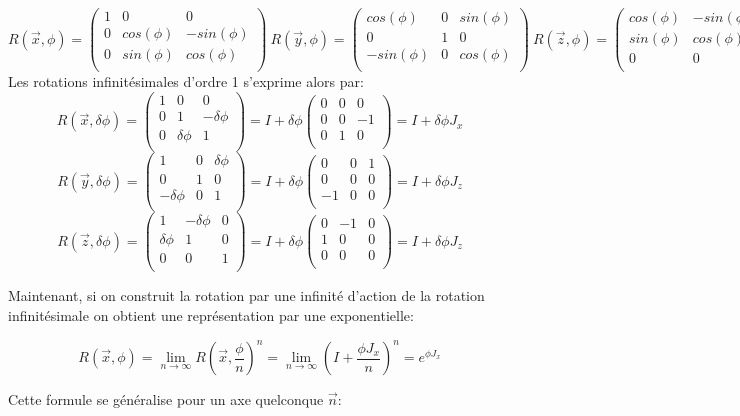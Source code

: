 \documentclass[12pt,a4paper]{article}
\newcommand{\Jx}
{
\begin{pmatrix}
	0&0&0\\
	0&0&-1\\
	0&1&0\\
\end{pmatrix}
}
\newcommand{\Jy}
{
	\begin{pmatrix}
		0&0&1\\
		0&0&0\\
		-1&0&0\\
	\end{pmatrix}
}
\newcommand{\Jz}
{
	\begin{pmatrix}
		0&-1&0\\
		1&0&0\\
		0&0&0\\
	\end{pmatrix}
}
\begin{document}
	\[	
	R(\vec{x},\phi)=
	\begin{pmatrix}
	1&0&0\\
	0&cos(\phi)&-sin(\phi)\\
	0&sin(\phi)&cos(\phi)\\	
	\end{pmatrix}\ 
	R(\vec{y},\phi)=
	\begin{pmatrix}
	cos(\phi)&0&sin(\phi)\\
	0&1&0\\
	-sin(\phi)&0&cos(\phi)\\
	\end{pmatrix}
	\  
	R(\vec{z},\phi)=
	\begin{pmatrix}
	cos(\phi)&-sin(\phi)&0\\
	sin(\phi)&cos(\phi)&0\\
	0&0&1\\
	\end{pmatrix}
	\]
	Les rotations infinitésimales d'ordre 1 s'exprime alors par:
	\[	
	R(\vec{x},\delta\phi)=
	\begin{pmatrix}
	1&0&0\\
	0&1&-\delta\phi\\
	0&\delta\phi&1\\	
	\end{pmatrix}= I + \delta\phi \Jx= I + \delta\phi J_x
	\]
	\[	
	R(\vec{y},\delta\phi)=
	\begin{pmatrix}
	1&0&\delta\phi\\
	0&1&0\\
	-\delta\phi&0&1\\
	\end{pmatrix}= I + \delta\phi \Jy= I + \delta\phi J_z
	\]
	\[	
	R(\vec{z},\delta\phi)=
	\begin{pmatrix}
	1&-\delta\phi&0\\
	\delta\phi&1&0\\
	0&0&1\\
	\end{pmatrix}= I + \delta\phi \Jz= I + \delta\phi J_z
	\]
	
	Maintenant, si on construit la rotation par une infinité d'action de la rotation infinitésimale on obtient une représentation par une exponentielle:
	
	\[	
		R(\vec{x},\phi) = \lim_{n \to \infty} R\left(\vec{x},\frac{\phi}{n}\right)^n= \lim_{n \to \infty} \left( I+\frac{\phi J_x}{n}\right)^n= e^{\phi J_x}
	\]	
	
	Cette formule se généralise pour un axe quelconque $\vec{n}$:
	
\end{document}
